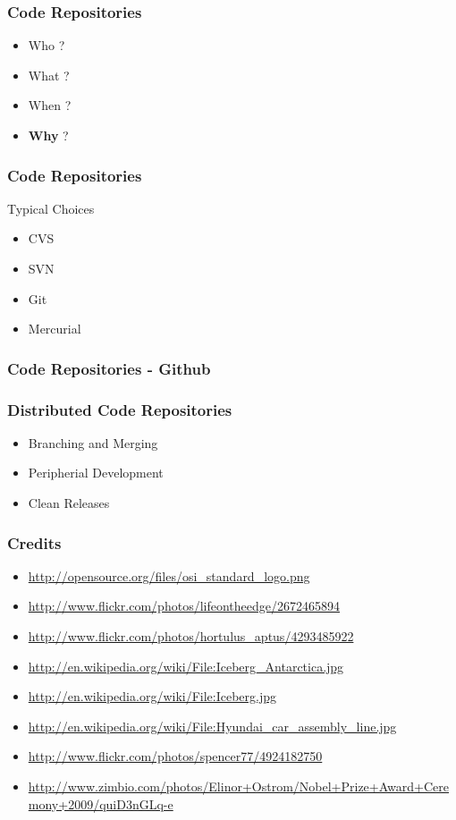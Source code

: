 \documentclass[18pt]{beamer}
\begin{document}
\begin{frame}
\frametitle{Code Repositories}
\Huge
\begin{itemize}
\item Who ?
\pause
\item What ?
\pause
\item When ?
\pause
\item \textbf{Why} ?
\end{itemize}
\end{frame}


\begin{frame}
\frametitle{Code Repositories}
\Huge
Typical Choices
\begin{itemize}
\item CVS
\pause
\item SVN
\pause
\item Git
\pause
\item Mercurial
\end{itemize}
\end{frame}


\begin{frame}
\frametitle{Code Repositories - Github}
\Huge
\end{frame}


\begin{frame}
\frametitle{Distributed Code Repositories}
\Huge
\begin{itemize}
\item Branching and Merging
\pause
\item Peripherial Development
\pause
\item Clean Releases
\end{itemize}
\end{frame}


\begin{frame}
\frametitle{Credits}
\begin{itemize}
\item \url{http://opensource.org/files/osi_standard_logo.png}
\item \url{http://www.flickr.com/photos/lifeontheedge/2672465894}
\item \url{http://www.flickr.com/photos/hortulus_aptus/4293485922}
\item \url{http://en.wikipedia.org/wiki/File:Iceberg_Antarctica.jpg}
\item \url{http://en.wikipedia.org/wiki/File:Iceberg.jpg}
\item \url{http://en.wikipedia.org/wiki/File:Hyundai_car_assembly_line.jpg}
\item \url{http://www.flickr.com/photos/spencer77/4924182750}
\item \url{http://www.zimbio.com/photos/Elinor+Ostrom/Nobel+Prize+Award+Ceremony+2009/quiD3nGLq-e}
\end{itemize}
\end{frame}
\end{document}
